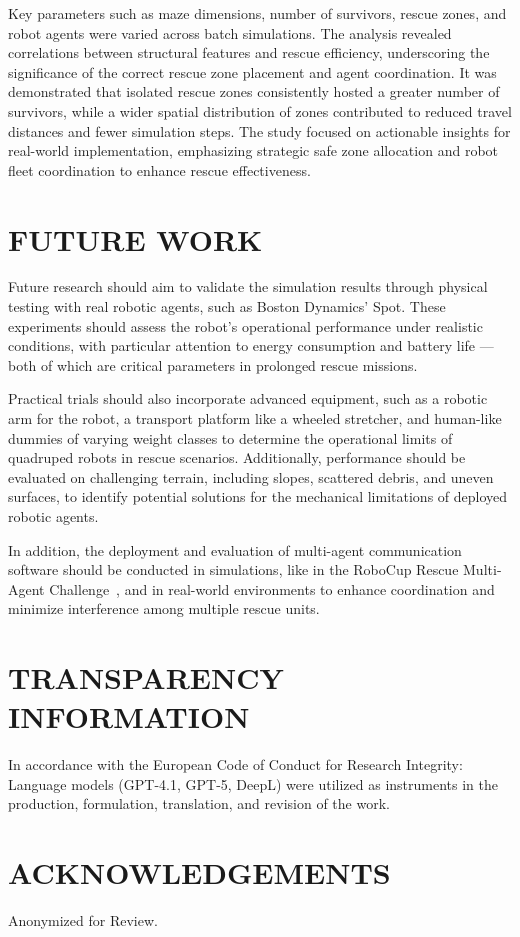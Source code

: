\documentclass[a4paper,twoside]{article}
\begin{document}
Key parameters such as maze dimensions, number of survivors, rescue zones, and robot agents were varied across batch simulations.
The analysis revealed correlations between structural features and rescue efficiency, underscoring the significance of the correct rescue zone placement and agent coordination.
It was demonstrated that isolated rescue zones consistently hosted a greater number of survivors, while a wider spatial distribution of zones contributed to reduced travel distances and fewer simulation steps.
The study focused on actionable insights for real-world implementation, emphasizing strategic safe zone allocation and robot fleet coordination to enhance rescue effectiveness.

\section{\uppercase{Future Work}}
\label{sec:future_work}

Future research should aim to validate the simulation results through physical testing with real robotic agents, such as Boston Dynamics' Spot. These experiments should assess the robot’s operational performance under realistic conditions, with particular attention to energy consumption and battery life — both of which are critical parameters in prolonged rescue missions.

Practical trials should also incorporate advanced equipment, such as a robotic arm for the robot, a transport platform like a wheeled stretcher, and human-like dummies of varying weight classes to determine the operational limits of quadruped robots in rescue scenarios. Additionally, performance should be evaluated on challenging terrain, including slopes, scattered debris, and uneven surfaces, to identify potential solutions for the mechanical limitations of deployed robotic agents.

In addition, the deployment and evaluation of multi-agent communication software should be conducted in simulations, like in the RoboCup Rescue Multi-Agent Challenge\ \cite{Visser2015RoboCup}, and in real-world environments to enhance coordination and minimize interference among multiple rescue units.

\section*{\uppercase{Transparency Information}}

In accordance with the European Code of Conduct for Research Integrity: Language models (GPT-4.1, GPT-5, DeepL) were utilized as instruments in the production, formulation, translation, and revision of the work.

\section*{\uppercase{Acknowledgements}}

Anonymized for Review.


{\small
}
\end{document}
